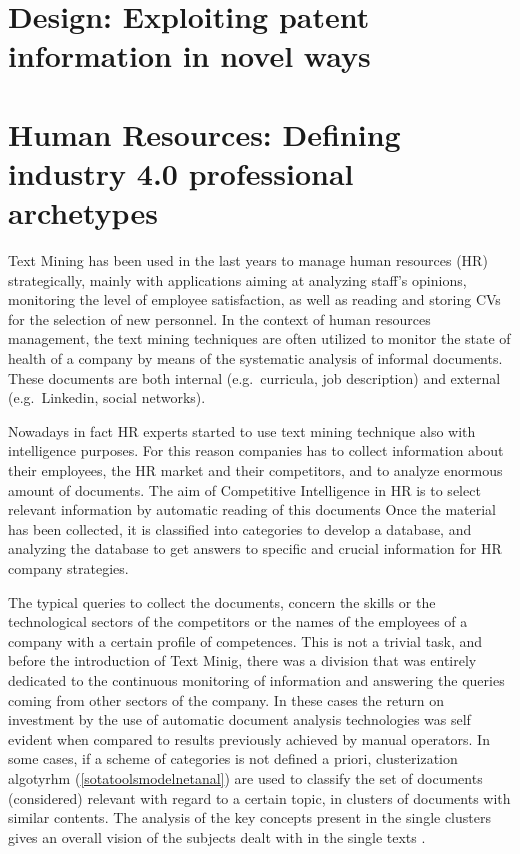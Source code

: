 \documentclass[]{book}
\begin{document}
\chapter{Design: Exploiting patent information in novel
ways}\label{design-exploiting-patent-information-in-novel-ways}

\chapter{Human Resources: Defining industry 4.0 professional
archetypes}\label{human-resources-defining-industry-4.0-professional-archetypes}

Text Mining has been used in the last years to manage human resources
(HR) strategically, mainly with applications aiming at analyzing staff's
opinions, monitoring the level of employee satisfaction, as well as
reading and storing CVs for the selection of new personnel. In the
context of human resources management, the text mining techniques are
often utilized to monitor the state of health of a company by means of
the systematic analysis of informal documents. These documents are both
internal (e.g.~curricula, job description) and external (e.g.~Linkedin,
social networks).

Nowadays in fact HR experts started to use text mining technique also
with intelligence purposes. For this reason companies has to collect
information about their employees, the HR market and their competitors,
and to analyze enormous amount of documents. The aim of Competitive
Intelligence in HR \citep{bolasco2005understanding} is to select
relevant information by automatic reading of this documents Once the
material has been collected, it is classified into categories to develop
a database, and analyzing the database to get answers to specific and
crucial information for HR company strategies.

The typical queries to collect the documents, concern the skills or the
technological sectors of the competitors or the names of the employees
of a company with a certain profile of competences. This is not a
trivial task, and before the introduction of Text Minig, there was a
division that was entirely dedicated to the continuous monitoring of
information and answering the queries coming from other sectors of the
company. In these cases the return on investment by the use of automatic
document analysis technologies was self evident when compared to results
previously achieved by manual operators. In some cases, if a scheme of
categories is not defined a priori, clusterization algotyrhm
(\ref{sotatoolsmodelnetanal}) are used to classify the set of documents
(considered) relevant with regard to a certain topic, in clusters of
documents with similar contents. The analysis of the key concepts
present in the single clusters gives an overall vision of the subjects
dealt with in the single texts \citep{gupta2009survey}.
\end{document}
